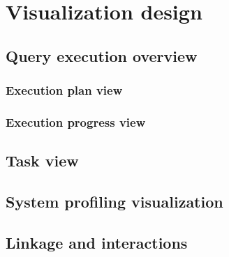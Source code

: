 \section{Visualization design}
\subsection{Query execution overview}
\subsubsection{Execution plan view}
\subsubsection{Execution progress view}
\subsection{Task view}
\subsection{System profiling visualization}
\subsection{Linkage and interactions}